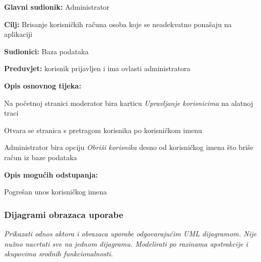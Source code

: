 					\noindent {}
					\begin{packed_item}
						
						\item \textbf{Glavni sudionik: }Administrator
						\item  \textbf{Cilj:} Brisanje korisničkih računa osoba koje se neadekvatno ponašaju na aplikaciji
						\item  \textbf{Sudionici:}
						Baza podataka
						\item  \textbf{Preduvjet:} korisnik prijavljen i ima ovlasti administratora
						\item  \textbf{Opis osnovnog tijeka:}
						
						\item[] \begin{packed_enum}
							
							\item	Na početnoj stranici moderator bira karticu \textit{Upravljanje korisnicima} na alatnoj traci
							\item	Otvara se stranica s pretragom korisnika po korisničkom imenu
							\item	Administrator bira opciju \textit{Obriši korisnika} desno od korisničkog imena što briše račun iz baze podataka
							
						\end{packed_enum}
						
						\item  \textbf{Opis mogućih odstupanja:}
						
						\item[] \begin{packed_item}
							
							\item[2.a] Pogrešan unos korisničkog imena
							
						\end{packed_item}
					\end{packed_item}
				
					
				\subsubsection{Dijagrami obrazaca uporabe}
					
					\textit{Prikazati odnos aktora i obrazaca uporabe odgovarajućim UML dijagramom. Nije nužno nacrtati sve na jednom dijagramu. Modelirati po razinama apstrakcije i skupovima srodnih funkcionalnosti.}
				\eject		
				
